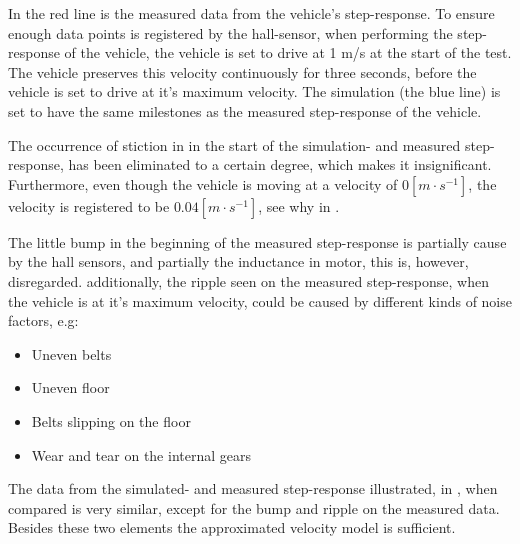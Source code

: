In  the red line is the measured data from the vehicle's step-response. To ensure enough data points is registered by the hall-sensor, when performing the step-response of the vehicle, the vehicle is set to drive at 1 m/s at the start of the test. The vehicle preserves this velocity continuously for three seconds, before the vehicle is set to drive at it's maximum velocity. The simulation (the blue line) is set to have the same milestones as the measured step-response of the vehicle. 

The occurrence of stiction in in the start of the simulation- and measured step-response, has been eliminated to a certain degree, which makes it insignificant. Furthermore, even though the vehicle is moving at a velocity of $0 [m \cdot s^{-1}]$, the velocity is registered to be $0.04 [m \cdot s^{-1}]$, see why in . 

The little bump in the beginning of the measured step-response is partially cause by the hall sensors, and partially the inductance in motor, this is, however, disregarded. additionally, the ripple seen on the measured step-response, when the vehicle is at it's maximum velocity, could be caused by different kinds of noise factors, e.g:

\begin{itemize}
\item Uneven belts 
\item Uneven floor
\item Belts slipping on the floor
\item Wear and tear on the internal gears
\end{itemize}

The data from the simulated- and measured step-response illustrated, in , when compared is very similar, except for the bump and ripple on the measured data. Besides these two elements the approximated velocity model is sufficient.